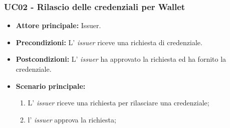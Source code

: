 \subsubsection{UC02 - Rilascio delle credenziali per Wallet}
\begin{itemize}
\item \textbf{Attore principale:} Issuer.
\item \textbf{Precondizioni:} L’ \textit{issuer} riceve una richiesta di credenziale.
\item \textbf{Postcondizioni:} L’ \textit{issuer} ha approvato la richiesta ed ha fornito la credenziale.
\item \textbf{Scenario principale:}
    \begin{enumerate}
        \item L' \textit{issuer} riceve una richiesta per rilasciare una credenziale; 
        \item l' \textit{issuer} approva la richiesta; 
    \end{enumerate}
\end{itemize}

